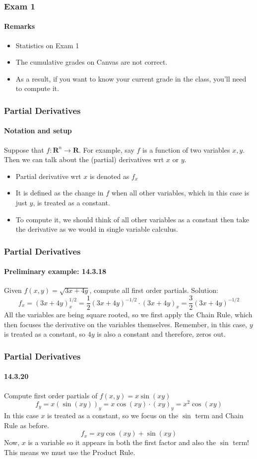 \documentclass[xcolor=svgnames]{beamer}
\begin{document}
\begin{frame}
\frametitle{Exam 1}
\framesubtitle{Remarks}
\begin{itemize}
\item Statistics on Exam 1
\item The cumulative grades on Canvas are not correct. 
\item As a result, if you want to know your current grade in the class, you'll need to compute it.
\end{itemize}
\end{frame}
\begin{frame}
\frametitle{Partial Derivatives}
\framesubtitle{Notation and setup}
Suppose that $f: \mathbf{R}^n \to \mathbf{R}$. For example, say $f$ is a function of two variables $x,y$. Then we can talk about the (partial) derivatives wrt $x$ or $y$. 

\begin{itemize}
\item Partial derivative wrt $x$ is denoted as $f_x$
\item It is defined as the change in $f$ when all other variables, which in this case is just $y$, is treated as a constant. 
\item To compute it, we should think of all other variables as a constant then take the derivative as we would in single variable calculus. 

\end{itemize}


\end{frame}
\begin{frame}
\frametitle{Partial Derivatives}
\framesubtitle{Preliminary example: 14.3.18}
Given $f(x,y) = \sqrt{3x + 4y}$, compute all first order partials. 
Solution: 
\[
f_x = (3x + 4y)^{1/2} _ x = \frac{1}{2} (3x + 4y)^{-1/2} \cdot (3x + 4y) _x = \frac{3}{2} (3x + 4y)^{-1/2}
\]
All the variables are being square rooted, so we first apply the Chain Rule, which then focuses the derivative on the variables themselves. Remember, in this case, $y$ is treated as a constant, so $4y$ is also a constant and therefore, zeros out. 
\end{frame}
\begin{frame}
\frametitle{Partial Derivatives}
\framesubtitle{14.3.20}
Compute first order partials of $f(x,y) = x \sin (xy)$
\[
f_y = x (\sin (xy))_y = x \cos (xy) \cdot (xy)_y = x^2 \cos (xy) 
\]
In this case $x$ is treated as a constant, so we focus on the $\sin$ term and Chain Rule as before. 
\[
f_x = xy \cos (xy) + \sin (xy)
\]
Now, $x$ is a variable so it appears in both the first factor and also the $\sin$ term! This means we must use the Product Rule. 
\end{frame}
\end{document}
